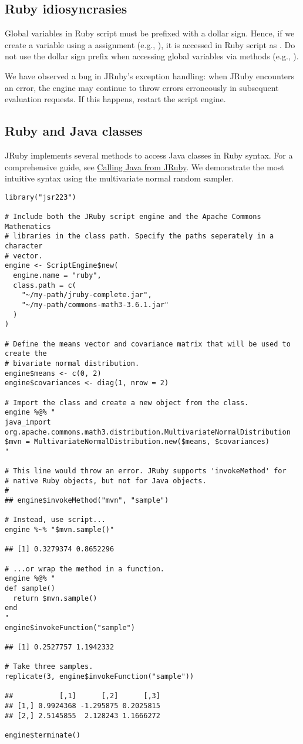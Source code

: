 \subsection{Ruby idiosyncrasies}

Global variables in Ruby script must be prefixed with a dollar sign. Hence, if we create a variable  using a  assignment (e.g., ), it is accessed in Ruby script as . Do not use the dollar sign prefix when accessing global variables via  methods (e.g., ).

We have observed a bug in JRuby's exception handling: when JRuby encounters an error, the engine may continue to throw errors erroneously in subsequent evaluation requests. If this happens, restart the script engine.

\subsection{Ruby and Java classes}

JRuby implements several methods to access Java classes in Ruby syntax. For a comprehensive guide, see \href{https://github.com/jruby/jruby/wiki/CallingJavaFromJRuby}{Calling Java from JRuby}. We demonstrate the most intuitive syntax using the multivariate normal random sampler.

\begin{verbatim}
library("jsr223")

# Include both the JRuby script engine and the Apache Commons Mathematics
# libraries in the class path. Specify the paths seperately in a character
# vector.
engine <- ScriptEngine$new(
  engine.name = "ruby",
  class.path = c(
    "~/my-path/jruby-complete.jar",
    "~/my-path/commons-math3-3.6.1.jar"
  )
)

# Define the means vector and covariance matrix that will be used to create the
# bivariate normal distribution.
engine$means <- c(0, 2)
engine$covariances <- diag(1, nrow = 2)

# Import the class and create a new object from the class.
engine %@% "
java_import org.apache.commons.math3.distribution.MultivariateNormalDistribution
$mvn = MultivariateNormalDistribution.new($means, $covariances)
"

# This line would throw an error. JRuby supports 'invokeMethod' for
# native Ruby objects, but not for Java objects.
#
## engine$invokeMethod("mvn", "sample")

# Instead, use script...
engine %~% "$mvn.sample()"

## [1] 0.3279374 0.8652296

# ...or wrap the method in a function.
engine %@% "
def sample()
  return $mvn.sample()
end
"
engine$invokeFunction("sample")

## [1] 0.2527757 1.1942332

# Take three samples.
replicate(3, engine$invokeFunction("sample"))

##           [,1]      [,2]      [,3]
## [1,] 0.9924368 -1.295875 0.2025815
## [2,] 2.5145855  2.128243 1.1666272

engine$terminate()
\end{verbatim}

